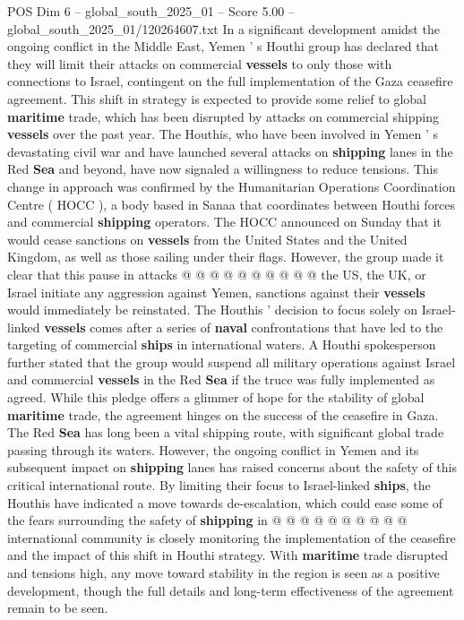 \begin{textsample}{POS Dim 6 – global\_south\_2025\_01 – Score 5.00 – global\_south\_2025\_01/120264607.txt}  \label{ex:f6_pos_351}
In a significant development amidst the ongoing conflict in the Middle East, Yemen ' s Houthi group has declared that they will limit their attacks on commercial \textbf{vessels} to only those with connections to Israel, contingent on the full implementation of the Gaza ceasefire agreement.
This shift in strategy is expected to provide some relief to global \textbf{maritime} trade, which has been disrupted by attacks on commercial shipping \textbf{vessels} over the past year.
The Houthis, who have been involved in Yemen ' s devastating civil war and have launched several attacks on \textbf{shipping} lanes in the Red \textbf{Sea} and beyond, have now signaled a willingness to reduce tensions.
This change in approach was confirmed by the Humanitarian Operations Coordination Centre ( HOCC ), a body based in Sanaa that coordinates between Houthi forces and commercial \textbf{shipping} operators.
The HOCC announced on Sunday that it would cease sanctions on \textbf{vessels} from the United States and the United Kingdom, as well as those sailing under their flags.
However, the group made it clear that this pause in attacks @ @ @ @ @ @ @ @ @ @ the US, the UK, or Israel initiate any aggression against Yemen, sanctions against their \textbf{vessels} would immediately be reinstated.
The Houthis ' decision to focus solely on Israel-linked \textbf{vessels} comes after a series of \textbf{naval} confrontations that have led to the targeting of commercial \textbf{ships} in international waters.
A Houthi spokesperson further stated that the group would suspend all military operations against Israel and commercial \textbf{vessels} in the Red \textbf{Sea} if the truce was fully implemented as agreed.
While this pledge offers a glimmer of hope for the stability of global \textbf{maritime} trade, the agreement hinges on the success of the ceasefire in Gaza.
The Red \textbf{Sea} has long been a vital shipping route, with significant global trade passing through its waters.
However, the ongoing conflict in Yemen and its subsequent impact on \textbf{shipping} lanes has raised concerns about the safety of this critical international route.
By limiting their focus to Israel-linked \textbf{ships}, the Houthis have indicated a move towards de-escalation, which could ease some of the fears surrounding the safety of \textbf{shipping} in @ @ @ @ @ @ @ @ @ @ international community is closely monitoring the implementation of the ceasefire and the impact of this shift in Houthi strategy.
With \textbf{maritime} trade disrupted and tensions high, any move toward stability in the region is seen as a positive development, though the full details and long-term effectiveness of the agreement remain to be seen.

\end{textsample}
